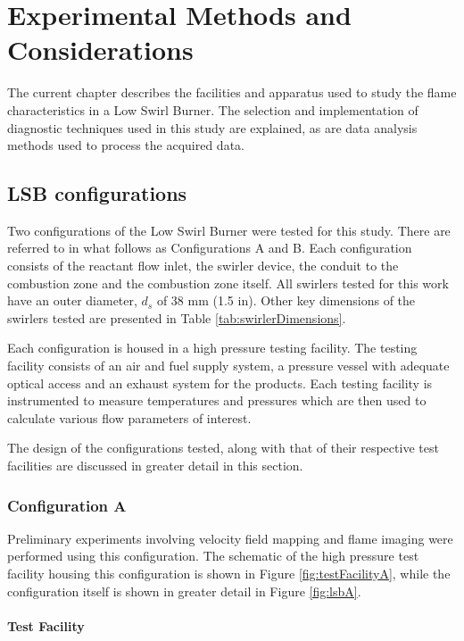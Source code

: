 \chapter{Experimental Methods and Considerations}

The current chapter describes the facilities and apparatus used to study the flame characteristics in a Low Swirl Burner.
The selection and implementation of diagnostic techniques used in this study are explained, as are data analysis methods used to process the acquired data.

\section{LSB configurations}

Two configurations of the Low Swirl Burner were tested for this study.
There are referred to in what follows as Configurations A and B.
Each configuration consists of the reactant flow inlet, the swirler device, the conduit to the combustion zone and the combustion zone itself.
All swirlers tested for this work have an outer diameter, \(d_s\) of 38 mm (1.5 in).
Other key dimensions of the swirlers tested are presented in Table \ref{tab:swirlerDimensions}.

Each configuration is housed in a high pressure testing facility.
The testing facility consists of an air and fuel supply system, a pressure vessel with adequate optical access and an exhaust system for the products.
Each testing facility is instrumented to measure temperatures and pressures which are then used to calculate various flow parameters of interest.

The design of the configurations tested, along with that of their respective test facilities are discussed in greater detail in this section.



\subsection{Configuration A}

Preliminary experiments involving velocity field mapping and flame imaging were performed using this configuration.
The schematic of the high pressure test facility housing this configuration is shown in Figure \ref{fig:testFacilityA}, while the configuration itself is shown in greater detail in Figure \ref{fig:lsbA}.

\subsubsection{Test Facility}

